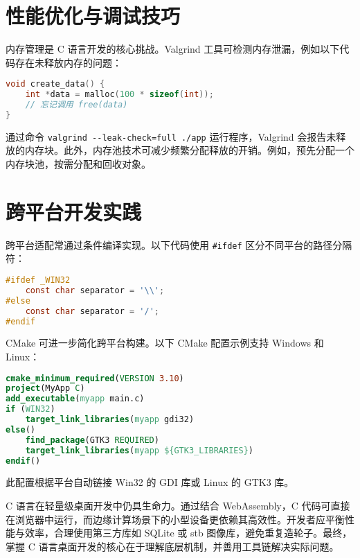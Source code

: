\chapter{性能优化与调试技巧}
内存管理是 C 语言开发的核心挑战。Valgrind 工具可检测内存泄漏，例如以下代码存在未释放内存的问题：\par
\begin{lstlisting}[language=c]
void create_data() {
    int *data = malloc(100 * sizeof(int));
    // 忘记调用 free(data)
}
\end{lstlisting}
通过命令 \verb!valgrind --leak-check=full ./app! 运行程序，Valgrind 会报告未释放的内存块。此外，内存池技术可减少频繁分配释放的开销。例如，预先分配一个内存块池，按需分配和回收对象。\par
\chapter{跨平台开发实践}
跨平台适配常通过条件编译实现。以下代码使用 \verb!#ifdef! 区分不同平台的路径分隔符：\par
\begin{lstlisting}[language=c]
#ifdef _WIN32
    const char separator = '\\';
#else
    const char separator = '/';
#endif
\end{lstlisting}
CMake 可进一步简化跨平台构建。以下 CMake 配置示例支持 Windows 和 Linux：\par
\begin{lstlisting}[language=cmake]
cmake_minimum_required(VERSION 3.10)
project(MyApp C)
add_executable(myapp main.c)
if (WIN32)
    target_link_libraries(myapp gdi32)
else()
    find_package(GTK3 REQUIRED)
    target_link_libraries(myapp ${GTK3_LIBRARIES})
endif()
\end{lstlisting}
此配置根据平台自动链接 Win32 的 GDI 库或 Linux 的 GTK3 库。\par
C 语言在轻量级桌面开发中仍具生命力。通过结合 WebAssembly，C 代码可直接在浏览器中运行，而边缘计算场景下的小型设备更依赖其高效性。开发者应平衡性能与效率，合理使用第三方库如 SQLite 或 stb 图像库，避免重复造轮子。最终，掌握 C 语言桌面开发的核心在于理解底层机制，并善用工具链解决实际问题。\par
